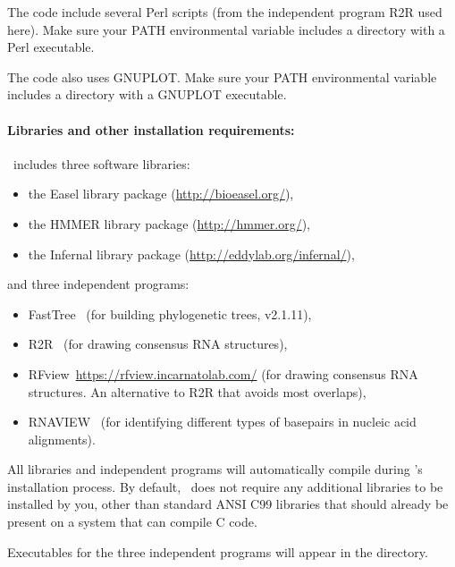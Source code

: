 The code include several Perl scripts (from the independent program
R2R used here). Make sure your PATH environmental variable includes a
directory with a Perl executable.

The code also uses GNUPLOT. Make sure your PATH environmental variable includes a
directory with a GNUPLOT executable.

\paragraph{Libraries and other installation requirements:}

\rscape\ includes three software libraries:

\begin{itemize}
\item the Easel library package (\url{http://bioeasel.org/}),
\item the HMMER library package (\url{http://hmmer.org/}),
\item the Infernal library package (\url{http://eddylab.org/infernal/}),
\end{itemize}

and three independent programs:

\begin{itemize}
\item FastTree~\citep{Price10} (for building phylogenetic trees, v2.1.11),
  
\item R2R~\citep{WeinbergBreaker11} (for drawing consensus RNA
  structures),

\item RFview~\url{https://rfview.incarnatolab.com/} (for drawing consensus RNA
  structures. An alternative to R2R that avoids most overlaps),

\item RNAVIEW~\citep{YangWesthof03} (for identifying different types of
  basepairs in nucleic acid alignments).
  
\end{itemize}

 All libraries and independent programs will automatically compile
 during \rscape's installation process.  By default, \rscape\ does not
 require any additional libraries to be installed by you, other than
 standard ANSI C99 libraries that should already be present on a
 system that can compile C code.

 Executables for the three independent programs will appear in the
  directory.

